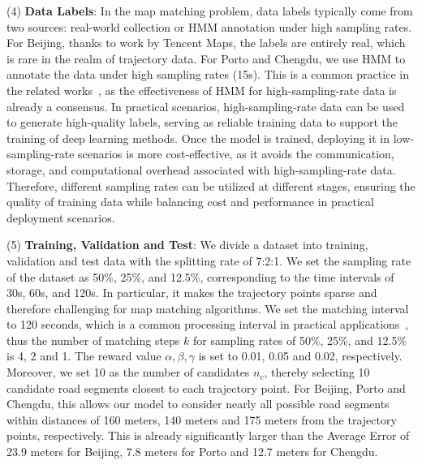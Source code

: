 \noindent (4) \textbf{Data Labels}: In the map matching problem, data labels typically come from two sources: real-world collection or HMM annotation under high sampling rates. For Beijing, thanks to work by Tencent Maps, the labels are entirely real, which is rare in the realm of trajectory data. For Porto and Chengdu, we use HMM to annotate the data under high sampling rates (15s). This is a common practice in the related works~\cite{LHMM, FL-AMM, l2mm}, as the effectiveness of HMM for high-sampling-rate data is already a consensus. In practical scenarios, high-sampling-rate data can be used to generate high-quality labels, serving as reliable training data to support the training of deep learning methods. Once the model is trained, deploying it in low-sampling-rate scenarios is more cost-effective, as it avoids the communication, storage, and computational overhead associated with high-sampling-rate data. Therefore, different sampling rates can be utilized at different stages, ensuring the quality of training data while balancing cost and performance in practical deployment scenarios.

\noindent (5) \textbf{Training, Validation and Test}: We divide a dataset into training, validation and test data with the splitting rate of 7:2:1. We set the sampling rate of the dataset as 50\%, 25\%, and 12.5\%, corresponding to the time intervals of 30s, 60s, and 120s. In particular, it makes the trajectory points sparse and therefore challenging for map matching algorithms. We set the matching interval to 120 seconds, which is a common processing interval in practical applications~\cite{graphmm}, thus the number of matching steps $k$ for sampling rates of 50\%, 25\%, and 12.5\% is 4, 2 and 1. The reward value $\alpha, \beta, \gamma$ is set to 0.01, 0.05 and 0.02, respectively. Moreover, we set 10 as the number of candidates $n_c$, thereby selecting 10 candidate road segments closest to each trajectory point. For Beijing, Porto and Chengdu, this allows our model to consider nearly all possible road segments within distances of 160 meters, 140 meters and 175 meters from the trajectory points, respectively. This is already significantly larger than the Average Error of 23.9 meters for Beijing, 7.8 meters for Porto and 12.7 meters for Chengdu.

